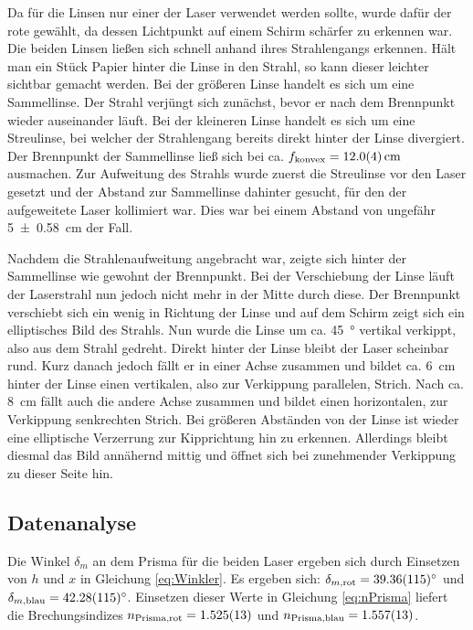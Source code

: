 		Da für die Linsen nur einer der Laser verwendet werden sollte, wurde dafür der rote gewählt, da dessen Lichtpunkt auf einem Schirm schärfer zu erkennen war.
		Die beiden Linsen ließen sich schnell anhand ihres Strahlengangs erkennen.
		Hält man ein Stück Papier hinter die Linse in den Strahl, so kann dieser leichter sichtbar gemacht werden.
		Bei der größeren Linse handelt es sich um eine Sammellinse.
		Der Strahl verjüngt sich zunächst, bevor er nach dem Brennpunkt wieder auseinander läuft.
		Bei der kleineren Linse handelt es sich um eine Streulinse, bei welcher der Strahlengang bereits direkt hinter der Linse divergiert. 
		Der Brennpunkt der Sammellinse ließ sich bei ca. $f_\text{konvex} = \SI{12+-0,4}{\centi\meter}$ ausmachen.
		Zur Aufweitung des Strahls wurde zuerst die Streulinse vor den Laser gesetzt und der Abstand zur Sammellinse dahinter gesucht, für den der aufgeweitete Laser kollimiert war.
		Dies war bei einem Abstand von ungefähr \SI{5+-0,58}{\centi\meter} der Fall.
		
		Nachdem die Strahlenaufweitung angebracht war, zeigte sich hinter der Sammellinse wie gewohnt der Brennpunkt.
		Bei der Verschiebung der Linse läuft der Laserstrahl nun jedoch nicht mehr in der Mitte durch diese.
		Der Brennpunkt verschiebt sich ein wenig in Richtung der Linse und auf dem Schirm zeigt sich ein elliptisches Bild des Strahls.
		Nun wurde die Linse um ca. \SI{45}{\degree} vertikal verkippt, also aus dem Strahl gedreht.
		Direkt hinter der Linse bleibt der Laser scheinbar rund.
		Kurz danach jedoch fällt er in einer Achse zusammen und bildet ca. \SI{6}{\centi\meter} hinter der Linse einen vertikalen, also zur Verkippung parallelen, Strich.
		Nach ca. \SI{8}{\centi\meter} fällt auch die andere Achse zusammen und bildet einen horizontalen, zur Verkippung senkrechten Strich.
		Bei größeren Abständen von der Linse ist wieder eine elliptische Verzerrung zur Kipprichtung hin zu erkennen.
		Allerdings bleibt diesmal das Bild annähernd mittig und öffnet sich bei zunehmender Verkippung zu dieser Seite hin.
		
	\subsection{Datenanalyse}
		
		Die Winkel $\delta_m$ an dem Prisma für die beiden Laser ergeben sich durch Einsetzen von $h$ und $x$ in Gleichung \ref{eq:Winkler}.
		Es ergeben sich: $\delta_{m,\text{rot}} = \SI{39,36+-1,15}{\degree}$ und $\delta_{m,\text{blau}} = \SI{42,28+-1,15}{\degree}$.
		Einsetzen dieser Werte in Gleichung \ref{eq:nPrisma} liefert die Brechungsindizes $n_\text{Prisma,rot} = \SI{1.525+-0.013}{}$ und $n_\text{Prisma,blau} = \SI{1.557+-0.013}{}$.
		
